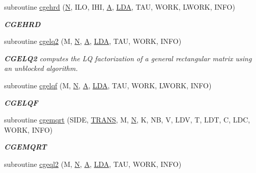 \begin{DoxyCompactItemize}
subroutine \hyperlink{group__complexGEcomputational_ga28cec12d94bb8978d75179b26a74adb2}{cgehrd} (\hyperlink{polmisc_8c_a0240ac851181b84ac374872dc5434ee4}{N}, I\+L\+O, I\+H\+I, \hyperlink{classA}{A}, \hyperlink{example__user_8c_ae946da542ce0db94dced19b2ecefd1aa}{L\+D\+A}, T\+A\+U, W\+O\+R\+K, L\+W\+O\+R\+K, I\+N\+F\+O)
\begin{DoxyCompactList}\small\item\em {\bfseries C\+G\+E\+H\+R\+D} \end{DoxyCompactList}\item 
subroutine \hyperlink{group__complexGEcomputational_gaf5aa309786b736467fe6b2353695883f}{cgelq2} (M, \hyperlink{polmisc_8c_a0240ac851181b84ac374872dc5434ee4}{N}, \hyperlink{classA}{A}, \hyperlink{example__user_8c_ae946da542ce0db94dced19b2ecefd1aa}{L\+D\+A}, T\+A\+U, W\+O\+R\+K, I\+N\+F\+O)
\begin{DoxyCompactList}\small\item\em {\bfseries C\+G\+E\+L\+Q2} computes the L\+Q factorization of a general rectangular matrix using an unblocked algorithm. \end{DoxyCompactList}\item 
subroutine \hyperlink{group__complexGEcomputational_gad670e88141738afef1b5580a33e6750f}{cgelqf} (M, \hyperlink{polmisc_8c_a0240ac851181b84ac374872dc5434ee4}{N}, \hyperlink{classA}{A}, \hyperlink{example__user_8c_ae946da542ce0db94dced19b2ecefd1aa}{L\+D\+A}, T\+A\+U, W\+O\+R\+K, L\+W\+O\+R\+K, I\+N\+F\+O)
\begin{DoxyCompactList}\small\item\em {\bfseries C\+G\+E\+L\+Q\+F} \end{DoxyCompactList}\item 
subroutine \hyperlink{group__complexGEcomputational_ga2f7b64261525b754c678b722eb0e8785}{cgemqrt} (S\+I\+D\+E, \hyperlink{superlu__enum__consts_8h_a0c4e17b2d5cea33f9991ccc6a6678d62a1f61e3015bfe0f0c2c3fda4c5a0cdf58}{T\+R\+A\+N\+S}, M, \hyperlink{polmisc_8c_a0240ac851181b84ac374872dc5434ee4}{N}, K, N\+B, V, L\+D\+V, T, L\+D\+T, C, L\+D\+C, W\+O\+R\+K, I\+N\+F\+O)
\begin{DoxyCompactList}\small\item\em {\bfseries C\+G\+E\+M\+Q\+R\+T} \end{DoxyCompactList}\item 
subroutine \hyperlink{group__complexGEcomputational_ga836bdb9b249392a6b4d70ba1e688b247}{cgeql2} (M, \hyperlink{polmisc_8c_a0240ac851181b84ac374872dc5434ee4}{N}, \hyperlink{classA}{A}, \hyperlink{example__user_8c_ae946da542ce0db94dced19b2ecefd1aa}{L\+D\+A}, T\+A\+U, W\+O\+R\+K, I\+N\+F\+O)

\end{DoxyCompactItemize}
